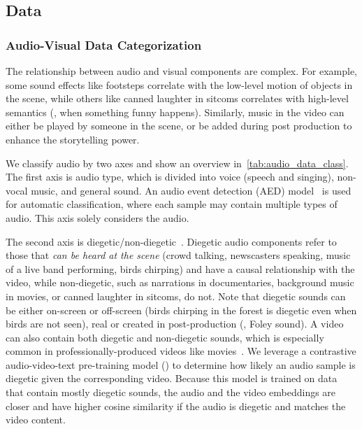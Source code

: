 \subsection{Data}

\subsubsection{Audio-Visual Data Categorization}
The relationship between audio and visual components are complex.
For example, some sound effects like footsteps correlate with the low-level motion of objects in the scene,
while others like canned laughter in sitcoms correlates with high-level semantics (\eg, when something funny happens).
Similarly, music in the video can either be played by someone in the scene,
or be added during post production to enhance the storytelling power.

We classify audio by two axes and show an overview in~\cref{tab:audio_data_class}.
The first axis is audio type, which is divided into voice (speech and singing), non-vocal music, and general sound.
An audio event detection (AED) model~\citep{gemmeke2017audio} is used for automatic classification,
where each sample may contain multiple types of audio. This axis solely considers the audio.

The second axis is diegetic/non-diegetic~\citep{dykhoff2012non, stilwell200711}.
Diegetic audio components refer to those that \textit{can be heard at the scene} (crowd talking, newscasters speaking, music of a live band performing, birds chirping) and have a causal relationship with the video,
while non-diegetic, such as narrations in documentaries, background music in movies, or canned laughter in sitcoms, do not.
Note that diegetic sounds can be either on-screen or off-screen (birds chirping in the forest is diegetic even when birds are not seen), real or created in post-production (\ie, Foley sound).
A video can also contain both diegetic and non-diegetic sounds, which is especially common in professionally-produced videos like movies~\citep{tan2017effects}.
We leverage a contrastive audio-video-text pre-training model (\CAVTPShort) to determine how likely an audio sample is diegetic given the corresponding video.
Because this model is trained on data that contain mostly diegetic sounds,
the audio and the video embeddings are closer and have higher cosine similarity if the audio is diegetic and matches the video content.

